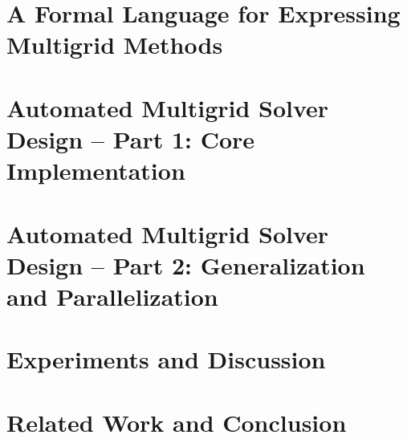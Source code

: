 \documentclass[
  paper = a5paper,
  language = english,
  acronym = nosymbol,
  acronymline = novertical,
  bibliography = combined,
  bibliographypart = all,
  titlesize = Huge,
  par = halfskip,
]{faupress}
\theoremstyle{definition}
\numberwithin{equation}{chapter}
\begin{document}
\chapter{A Formal Language for Expressing Multigrid Methods}
\label{chapter:multigrid-formal-language}
  
\chapter{Automated Multigrid Solver Design -- Part 1: Core Implementation}
\label{chapter:evostencils-1}
  
\chapter{Automated Multigrid Solver Design -- Part 2: Generalization and Parallelization}
  \label{chapter:evostencils-2}
  
\chapter{Experiments and Discussion}
\label{chapter:experiments}
  
\chapter{Related Work and Conclusion}
  
  

\appendix 


\backmatter
  \faupressprintbibliography
\end{document}
